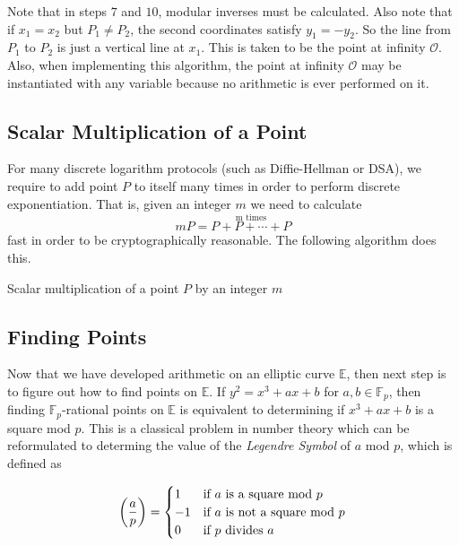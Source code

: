 Note that in steps $7$ and $10$, modular inverses must be calculated. Also note that if $x_1 = x_2$ but $P_1 \neq P_2$, the second coordinates satisfy $y_1 = -y_2$. So the line from $P_1$ to $P_2$ is just a vertical line at $x_1$. This is taken to be the point at infinity $\mathcal{O}$. Also, when implementing this algorithm, the point at infinity $\mathcal{O}$ may be instantiated with any variable because no arithmetic is ever performed on it. 

\subsection{Scalar Multiplication of a Point}

For many discrete logarithm protocols (such as Diffie-Hellman or DSA), we require to add point $P$ to itself many times in order to perform discrete exponentiation. That is, given an integer $m$ we need to calculate $$mP = \stackrel{\text{m times}}{P + P + \cdots + P}$$ fast in order to be cryptographically reasonable. The following algorithm does this.

\begin{algorithm} 
	\caption{Scalar multiplication of a point $P$ by an integer $m$}
	\begin{algorithmic}[1]
		  		\State {}
		  		\State {}
		  		\State {}
		  	\Else 
		  		\State {}
		  	\EndIf
	  	\EndFunction
	\end{algorithmic} 
\end{algorithm} 

\subsection{Finding Points}

Now that we have developed arithmetic on an elliptic curve $\mathbb{E}$, then next step is to figure out how to find points on $\mathbb{E}$. If $y^2 = x^3 + ax + b$ for $a,b \in \mathbb{F}_p$, then finding $\mathbb{F}_p$-rational points on $\mathbb{E}$ is equivalent to determining if $x^3 + ax + b$ is a square mod $p$. This is a classical problem in number theory which can be reformulated to determing the value of the \textit{Legendre Symbol} of $a$ mod $p$, which is defined as 

$$ \left(\frac{a}{p}\right) =
\begin{cases}
1 &\text{if }a \text{ is a square mod } p\\
-1 &\text{if }a \text{ is not a square mod }p\\
0 & \text{if } p \text{ divides }a
\end{cases} 
$$ 

